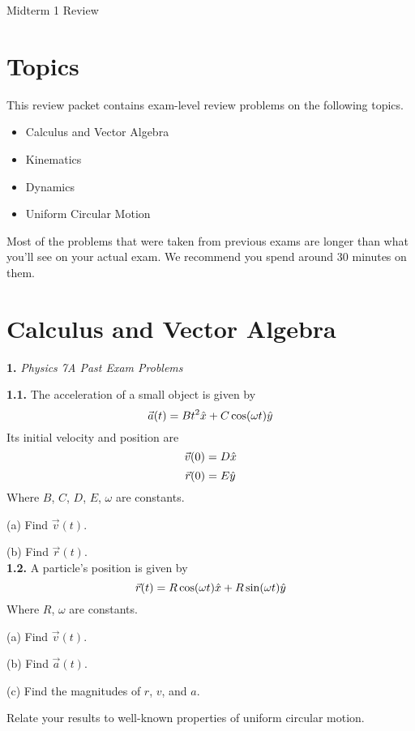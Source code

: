 \documentclass[11pt]{article}
\theoremstyle{gangnamstyle}{\newtheorem{definition}{Definition}[]}
\theoremstyle{gangnamstyle}{\newtheorem{example}{Example}[]}
\theoremstyle{gangnamstyle}{\newtheorem{problem}{Problem}[]}
\begin{document}
\normalfont
\pagestyle{pages}


\begin{center}
\vspace{3in}
{\Large Midterm 1 Review } \\ [0.05in]
\end{center}

\section*{Topics}
This review packet contains exam-level review problems on the following topics. 
\begin{itemize}
\item Calculus and Vector Algebra
\item Kinematics
\item Dynamics
\item Uniform Circular Motion
\end{itemize}
Most of the problems that were taken from previous exams are longer than what you'll see on your actual exam. We recommend you spend around 30 minutes on them. 

\pagebreak

\section{Calculus and Vector Algebra}
\textbf{1.} \textit{Physics 7A Past Exam Problems} 

\textbf{1.1.} The acceleration of a small object is given by
\[ \Vec{a}(t) = Bt^2 \Hat{x} + C\cos(\omega t) \Hat{y} \]
Its initial velocity and position are
\[ \Vec{v}(0) = D\Hat{x} \]
\[ \Vec{r}(0) = E\Hat{y} \]
Where $B$, $C$, $D$, $E$, $\omega$ are constants. 

(a) Find $\Vec{v}(t)$. 

(b) Find $\Vec{r}(t)$. \\

\textbf{1.2.} A particle's position is given by
\[ \Vec{r}(t) = R\cos(\omega t) \Hat{x} + R\sin(\omega t) \Hat{y} \]
Where $R$, $\omega$ are constants. 

(a) Find $\Vec{v}(t)$. 

(b) Find $\Vec{a}(t)$. 

(c) Find the magnitudes of $r$, $v$, and $a$. 

Relate your results to well-known properties of uniform circular motion. 

\pagebreak
\end{document}
